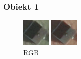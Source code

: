 \documentclass[a4paper,12pt]{article}  %
\begin{document}
\subsubsection{Obiekt 1}
\begin{figure}[H]
    \centering
    \begin{minipage}{0.24\textwidth}
        \centering
        \includegraphics[width=\linewidth]{spektralne/rgb_budynek7.png}
        \caption*{RGB}
    \end{minipage}
    \begin{minipage}{0.24\textwidth}
        \centering
        \includegraphics[width=\linewidth]{spektralne/irgb_budynek7.png}

\end{minipage}
\end{figure}
\end{document}
